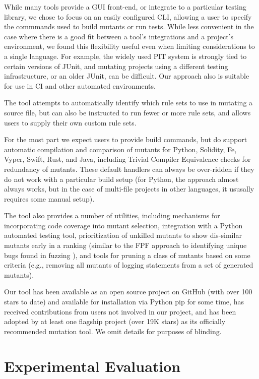 \documentclass[sigconf,review, anonymous]{acmart}
\begin{document}
{While many tools provide a GUI front-end, or integrate to a particular
testing library, we chose to focus on an easily configured CLI,
allowing a user to specify the commmands used to build mutants or
run tests.  While less convenient in the case where there is a good
fit between a tool's integrations and a project's environment, we
found this flexibility useful even when limiting considerations to a
single language.  For example, the widely used PIT system is strongly tied to
certain versions of JUnit, and mutating projects using a different
testing infrastructure, or an older JUnit, can be difficult.  Our
approach also is suitable for use in CI and other automated
environments.

The tool attempts to automatically identify which rule sets to use in
mutating a source file, but can also be instructed to run fewer or
more rule sets, and allows users to supply their own custom rule sets.

For the most part we expect users to provide build commands, but do
support automatic compilation and comparison of mutants for Python,
Solidity, Fe, Vyper, Swift, Rust, and Java, including Trivial Compiler
Equivalence \cite{TCE} checks for redundancy of mutants.  These
default handlers can always be over-ridden if they do not work with a
particular build setup (for Python, the approach almost always works,
but in the case of multi-file projects in other languages, it ususally
requires some manual setup).

The tool also provides a number of utilities, including mechanisms for
incorporating code coverage into mutant selection, integration with a
Python automated testing tool, prioritization of unkilled mutants to
show dis-similar mutants early in a ranking (similar to the FPF
approach to identifying unique bugs found in fuzzing
\cite{10.1145/2491956.2462173}), and tools for pruning a class of
mutants based on some criteria (e.g., removing all mutants of logging
statements from a set of generated mutants).

Our tool has been available as an open source project on GitHub (with
over 100 stars to date) and
available for installation via Python pip for
some time, has received contributions from users not involved in
our project, and has been adopted by at least one flagship project
(over 19K stars) as
its officially recommended mutation tool.  We omit details for
purposes of blinding.

\section{Experimental Evaluation}

}
\end{document}
